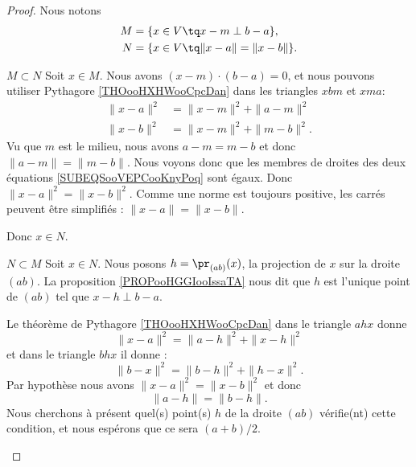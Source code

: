 \begin{proof}
    Nous notons 
    \begin{subequations}
        \begin{align}
    M&=\{ x\in V\tq x-m\perp b-a \},\\
    N&=\{ x\in V\tq \| x-a \|=\| x-b \| \}.
        \end{align}
    \end{subequations}
    \begin{subproof}
        \item[\( M\subset N\)]
            Soit \( x\in M\). Nous avons \( (x-m)\cdot (b-a)=0\), et nous pouvons utiliser Pythagore \ref{THOooHXHWooCpcDan} dans les triangles \( xbm\) et \( xma\):
            \begin{subequations}        \label{SUBEQSooVEPCooKnyPoq}
                \begin{align}
                    \| x-a \|^2&=\| x-m \|^2+\| a-m \|^2\\
                    \| x-b \|^2&=\| x-m \|^2+\| m-b \|^2.
                \end{align}
            \end{subequations}
            Vu que \( m\) est le milieu, nous avons \( a-m=m-b\) et donc \( \| a-m \|=\| m-b \|\). Nous voyons donc que les membres de droites des deux équations \eqref{SUBEQSooVEPCooKnyPoq} sont égaux. Donc \( \| x-a \|^2=\| x-b \|^2\). Comme une norme est toujours positive, les carrés peuvent être simplifiés : \( \| x-a \|=\| x-b \|\).

            Donc \( x\in N\).
        \item[\( N\subset M\)]
            Soit \( x\in N\). Nous posons \( h=\pr_{(ab)}(x)\), la projection de \( x\) sur la droite \( (ab)\). La proposition \ref{PROPooHGGIooIssaTA} nous dit que \( h\) est l'unique point de \( (ab)\) tel que \( x-h\perp b-a\).

            Le théorème de Pythagore \ref{THOooHXHWooCpcDan} dans le triangle \( ahx\) donne
            \begin{equation}
                \| x-a \|^2=\| a-h \|^2+\| x-h \|^2
            \end{equation}
            et dans le triangle \( bhx\) il donne :
            \begin{equation}
                \| b-x \|^2=\| b-h \|^2+\| h-x \|^2.
            \end{equation}
            Par hypothèse nous avons \( \| x-a \|^2=\| x-b \|^2\) et donc
            \begin{equation}
                \| a-h \|=\| b-h \|.
            \end{equation}
            Nous cherchons à présent quel(s) point(s) \( h\) de la droite \( (ab)\) vérifie(nt) cette condition, et nous espérons que ce sera \( (a+b)/2\).


\end{subproof}
\end{proof}
